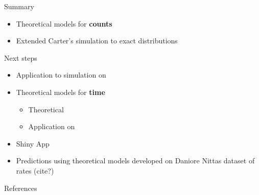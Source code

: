 \documentclass[english]{beamer}\usepackage[]{graphicx}\usepackage[]{xcolor}
\begin{document}
% 
% 
% 
% 
% 
% 



\begin{frame}{Summary}
\begin{itemize}
\item Theoretical models for \textbf{counts}
\item Extended Carter's simulation to exact distributions
\end{itemize}

\end{frame}


\begin{frame}{Next steps}
\begin{itemize}
\item Application to simulation on \cite{carter2004application}
\item Theoretical models for \textbf{time} 
	\begin{itemize}
	\item Theoretical
	\item Application on \cite{carter2004application}
	\end{itemize}
\item Shiny App
\item Predictions using theoretical models developed on Daniore Nittas dataset of rates (cite?)
\end{itemize}

\end{frame}

\begin{frame}{References}
  \small
  

\end{frame}




\end{document}
